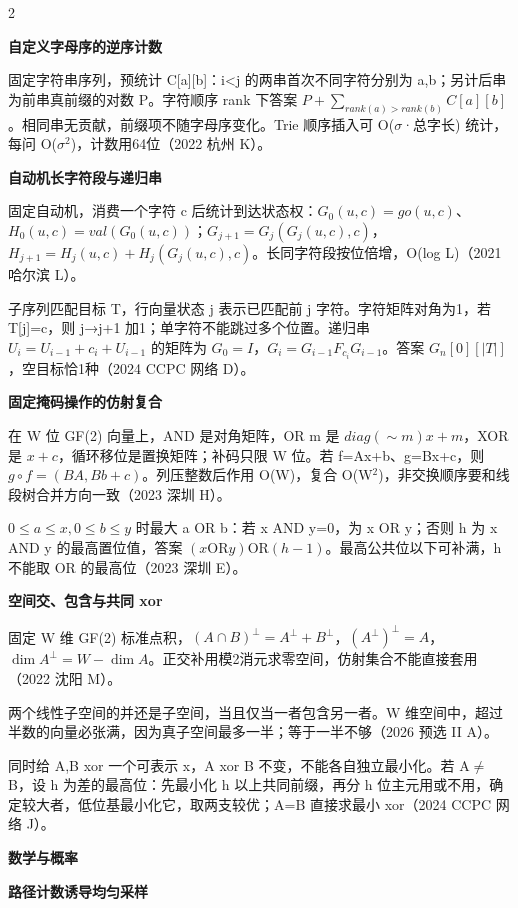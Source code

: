 \documentclass[UTF8,fontset=fandol,a4paper,twoside]{ctexart}
\newcommand{\topic}[1]{\par\smallskip\textbf{#1}\par\nobreak}
\newcommand{\note}[1]{{\fontsize{10}{12}\selectfont #1\par}}
\begin{document}
\begin{multicols}{2}
\par\textbf{自定义字母序的逆序计数}\quad
\note{固定字符串序列，预统计 C[\allowbreak{}a]\allowbreak{}[\allowbreak{}b]\allowbreak{}：i<\allowbreak{}j 的两串首次不同字符分别为 a,\allowbreak{}b；另计后串为前串真前缀的对数 P。字符顺序 rank 下答案 $P+\sum_{rank(a)>rank(b)}C[a][b]$。相同串无贡献，前缀项不随字母序变化。Trie 顺序插入可 O(\allowbreak{}\ensuremath{\sigma}·总字长)\allowbreak{} 统计，每问 O(\allowbreak{}\ensuremath{\sigma}\ensuremath{^2})\allowbreak{}，计数用64位（2022 杭州 K）。}
\par\textbf{自动机长字符段与递归串}\quad
\note{固定自动机，消费一个字符 c 后统计到达状态权：$G_0(u,c)=go(u,c)$、$H_0(u,c)=val(G_0(u,c))$；$G_{j+1}=G_j(G_j(u,c),c)$，$H_{j+1}=H_j(u,c)+H_j(G_j(u,c),c)$。长同字符段按位倍增，O(\allowbreak{}log L)\allowbreak{}（2021 哈尔滨 L）。}
\note{子序列匹配目标 T，行向量状态 j 表示已匹配前 j 字符。字符矩阵对角为1，若 T[\allowbreak{}j]\allowbreak{}=\allowbreak{}c，则 j→j+\allowbreak{}1 加1；单字符不能跳过多个位置。递归串 $U_i=U_{i-1}+c_i+U_{i-1}$ 的矩阵为 $G_0=I$，$G_i=G_{i-1}F_{c_i}G_{i-1}$。答案 $G_n[0][|T|]$，空目标恰1种（2024 CCPC 网络 D）。}
\par\textbf{固定掩码操作的仿射复合}\quad
\note{在 W 位 GF(\allowbreak{}2)\allowbreak{} 向量上，AND 是对角矩阵，OR m 是 $diag(\sim m)x+m$，XOR 是 $x+c$，循环移位是置换矩阵；补码只限 W 位。若 f=\allowbreak{}Ax+\allowbreak{}b、g=\allowbreak{}Bx+\allowbreak{}c，则 $g\circ f=(BA,Bb+c)$。列压整数后作用 O(\allowbreak{}W)\allowbreak{}，复合 O(\allowbreak{}W\ensuremath{^2})\allowbreak{}，非交换顺序要和线段树合并方向一致（2023 深圳 H）。}
\note{$0\le a\le x,0\le b\le y$ 时最大 a OR b：若 x AND y=\allowbreak{}0，为 x OR y；否则 h 为 x AND y 的最高置位值，答案 $(x\mathbin{\mathrm{OR}}y)\mathbin{\mathrm{OR}}(h-1)$。最高公共位以下可补满，h 不能取 OR 的最高位（2023 深圳 E）。}
\par\textbf{空间交、包含与共同 xor}\quad
\note{固定 W 维 GF(\allowbreak{}2)\allowbreak{} 标准点积，$(A\cap B)^\perp=A^\perp+B^\perp$，$(A^\perp)^\perp=A$，$\dim A^\perp=W-\dim A$。正交补用模2消元求零空间，仿射集合不能直接套用（2022 沈阳 M）。}
\note{两个线性子空间的并还是子空间，当且仅当一者包含另一者。W 维空间中，超过半数的向量必张满，因为真子空间最多一半；等于一半不够（2026 预选 II A）。}
\note{同时给 A,\allowbreak{}B xor 一个可表示 x，A xor B 不变，不能各自独立最小化。若 A\ensuremath{\ne}B，设 h 为差的最高位：先最小化 h 以上共同前缀，再分 h 位主元用或不用，确定较大者，低位基最小化它，取两支较优；A=\allowbreak{}B 直接求最小 xor（2024 CCPC 网络 J）。}
\topic{数学与概率}
\par\textbf{路径计数诱导均匀采样}\quad

\end{multicols}
\end{document}
